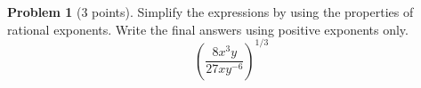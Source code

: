 \documentclass[11pt]{article}
\theoremstyle{definition}
\newtheorem{problem}{Problem}
\begin{document}
\section*{}

\begin{problem}[3 points] Simplify the expressions by using the properties of rational exponents. Write the final answers using positive exponents only.
\[\left(\frac{8x^{3}y}{27xy^{-6}}\right)^{1/3} \]



\end{problem}
\end{document}
